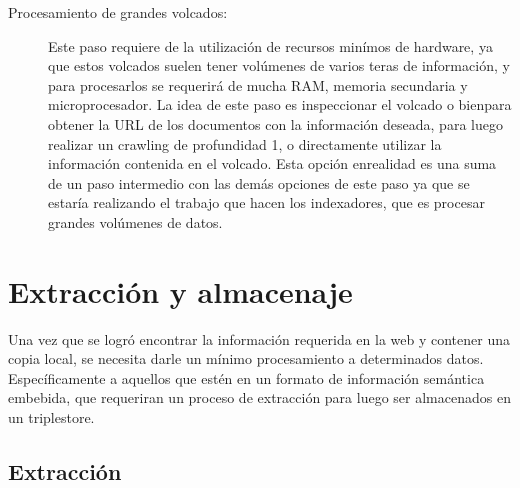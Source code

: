\begin{description}
\item[Procesamiento de grandes volcados:] Este paso requiere de la utilización de recursos minímos de hardware, ya que estos volcados suelen tener volúmenes de varios teras de información, y para procesarlos se requerirá 
de mucha RAM, memoria secundaria y microprocesador.
La idea de este paso es inspeccionar el volcado o bienpara obtener la URL de los documentos con la información deseada, para luego realizar un crawling de profundidad 1, 
o directamente utilizar la información contenida en el volcado.
Esta opción enrealidad es una suma de un paso intermedio con las demás opciones de este paso ya que se estaría realizando el trabajo que hacen los indexadores, que es procesar grandes volúmenes de datos.
\end{description}

\section{Extracción y almacenaje}
\label{section:extraccion}
Una vez que se logró encontrar la información requerida en la web y contener una copia local, se necesita darle un mínimo procesamiento a determinados datos.
Específicamente a aquellos que estén en un formato de información semántica embebida, que requeriran un proceso de extracción para luego ser almacenados en un triplestore.


\subsection{Extracción}

